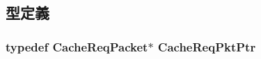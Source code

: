 \subsection{型定義}
\hypertarget{cache__unit_8hh_aa87027cd980bef753db5680223be4acd}{
\subsubsection[{CacheReqPktPtr}]{\setlength{\rightskip}{0pt plus 5cm}typedef {\bf CacheReqPacket}$\ast$ {\bf CacheReqPktPtr}}}
\label{cache__unit_8hh_aa87027cd980bef753db5680223be4acd}
